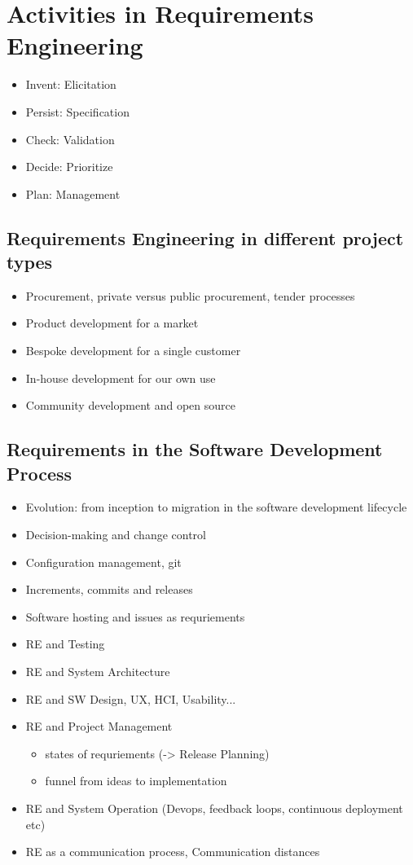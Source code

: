 \section{Activities in Requirements Engineering}

\begin{itemize}
  \item Invent: Elicitation
  \item Persist: Specification
  \item Check: Validation
  \item Decide: Prioritize
  \item Plan: Management
\end{itemize}

\subsection{Requirements Engineering in different project types}

\begin{itemize}
  \item Procurement, private versus public procurement, tender processes
  \item Product development for a market
  \item Bespoke development for a single customer
  \item In-house development for our own use
  \item Community development and open source
\end{itemize}

\subsection{Requirements in the Software Development Process}

\begin{itemize}
  \item Evolution: from inception to migration in the software development lifecycle
  \item Decision-making and change control
  \item Configuration management, git
  \item Increments, commits and releases
  \item Software hosting and issues as requriements
  \item RE and Testing
  \item RE and System Architecture
  \item RE and SW Design, UX, HCI, Usability...
  \item RE and Project Management
  \begin{itemize}
    \item states of requriements (-> Release Planning)
    \item funnel from ideas to implementation
  \end{itemize}
   \item RE and System Operation (Devops, feedback loops, continuous deployment etc)
   \item RE as a communication process, Communication distances
\end{itemize}

